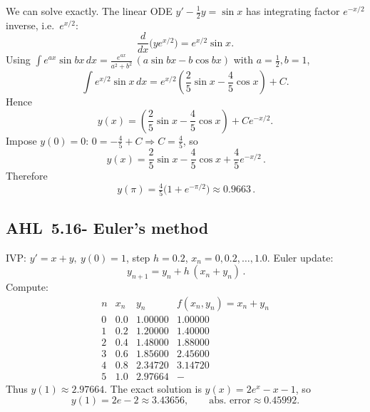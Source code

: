 \documentclass[11pt]{article}
\def\mathbf#1{#1}%
\newcommand{\tocsubsection}[1]{\subsection{#1}}
\begin{document}
\begin{solution}
We can solve exactly. The linear ODE $y'-\tfrac12 y=\sin x$ has integrating factor $e^{-x/2}$ inverse, i.e.\ $e^{x/2}$:
\[
\frac{d}{dx}\big(y e^{x/2}\big)=e^{x/2}\sin x.
\]
Using $\displaystyle \int e^{ax}\sin bx\,dx=\frac{e^{ax}}{a^{2}+b^{2}}\,(a\sin bx-b\cos bx)$ with $a=\tfrac12,b=1$,
\[
\int e^{x/2}\sin x\,dx=e^{x/2}\!\left(\frac{2}{5}\sin x-\frac{4}{5}\cos x\right)+C.
\]
Hence
\[
y(x)=\left(\frac{2}{5}\sin x-\frac{4}{5}\cos x\right)+C e^{-x/2}.
\]
Impose $y(0)=0$: $0=-\tfrac{4}{5}+C\Rightarrow C=\tfrac{4}{5}$, so
\[
\boxed{\,y(x)=\frac{2}{5}\sin x-\frac{4}{5}\cos x+\frac{4}{5}e^{-x/2}\,}.
\]
Therefore
\[
\boxed{\,y(\pi)=\tfrac{4}{5}\big(1+e^{-\pi/2}\big)\approx 0.9663\,}.
\]

\begin{center}
\end{center}
\end{solution}




\tocsubsection{AHL 5.16- Euler's method}


\begin{solution}
IVP: $y'=x+y,\ y(0)=1$, step $h=0.2$, $x_n=0,0.2,\dots,1.0$.
Euler update:
\[
\boxed{\,y_{n+1}=y_n+h\,(x_n+y_n)\,}.
\]
Compute:
\[
\begin{array}{c|c|c|c}
n & x_n & y_n & f(x_n,y_n)=x_n+y_n\\ \hline
0&0.0&1.00000&1.00000\\
1&0.2&1.20000&1.40000\\
2&0.4&1.48000&1.88000\\
3&0.6&1.85600&2.45600\\
4&0.8&2.34720&3.14720\\
5&1.0&\mathbf{2.97664}&-
\end{array}
\]
Thus $y(1)\approx \boxed{2.97664}$. The exact solution is $y(x)=2e^{x}-x-1$, so
\[
y(1)=2e-2\approx 3.43656,\qquad
\text{abs. error}\approx \boxed{0.45992}.
\]
\end{solution}
\end{document}
